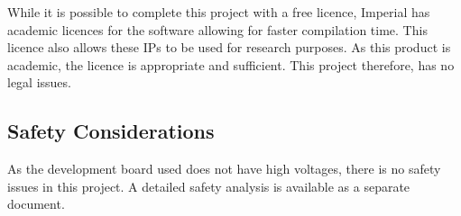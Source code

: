 While it is possible to complete this project with a free licence,
Imperial has academic licences for the software allowing for faster
compilation time.
This licence also allows these IPs to be used for research purposes.
As this product is academic, the licence is appropriate and sufficient.
This project therefore, has no legal issues.

\subsection{Safety Considerations}
As the development board used does not have high voltages, there is no safety
issues in this project.
A detailed safety analysis is available as a separate document.